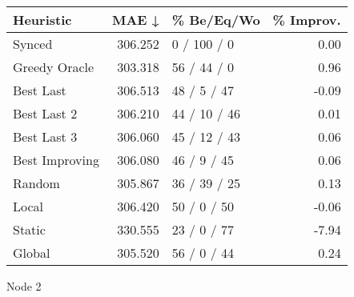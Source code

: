 \begin{tabular}{lrlr}
\toprule
\textbf{Heuristic} & \textbf{MAE ↓} & \textbf{\% Be/Eq/Wo} & \textbf{\% Improv.} \\
\midrule
            Synced &        306.252 &          0 / 100 / 0 &                0.00 \\
     Greedy Oracle &        303.318 &          56 / 44 / 0 &                0.96 \\
         Best Last &        306.513 &          48 / 5 / 47 &               -0.09 \\
       Best Last 2 &        306.210 &         44 / 10 / 46 &                0.01 \\
       Best Last 3 &        306.060 &         45 / 12 / 43 &                0.06 \\
    Best Improving &        306.080 &          46 / 9 / 45 &                0.06 \\
            Random &        305.867 &         36 / 39 / 25 &                0.13 \\
             Local &        306.420 &          50 / 0 / 50 &               -0.06 \\
            Static &        330.555 &          23 / 0 / 77 &               -7.94 \\
            Global &        305.520 &          56 / 0 / 44 &                0.24 \\
\bottomrule
\end{tabular}
\caption{Node 2}
\label{tab:non_lr05_le1_bs4_2}

